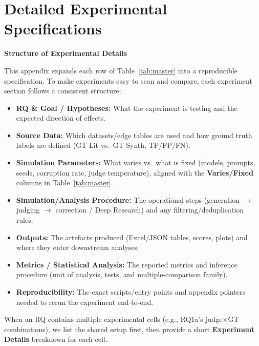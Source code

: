 \chapter{Detailed Experimental Specifications}
\label{app:experiment_details}

\label{sec:experimental_details}

\noindent\textbf{Structure of Experimental Details}
\label{sec:experiment_details_structure}

This appendix expands each row of Table~\ref{tab:master} into a reproducible specification. To make experiments easy to scan and compare, each experiment section follows a consistent structure:
\begin{itemize}[noitemsep]
    \item \textbf{RQ \& Goal / Hypotheses:} What the experiment is testing and the expected direction of effects.
    \item \textbf{Source Data:} Which datasets/edge tables are used and how ground truth labels are defined (GT Lit vs.\ GT Synth, TP/FP/FN).
    \item \textbf{Simulation Parameters:} What varies vs.\ what is fixed (models, prompts, seeds, corruption rate, judge temperature), aligned with the \textbf{Varies/Fixed} columns in Table~\ref{tab:master}.
    \item \textbf{Simulation/Analysis Procedure:} The operational steps (generation $\rightarrow$ judging $\rightarrow$ correction / Deep Research) and any filtering/deduplication rules.
    \item \textbf{Outputs:} The artefacts produced (Excel/JSON tables, scores, plots) and where they enter downstream analyses.
    \item \textbf{Metrics / Statistical Analysis:} The reported metrics and inference procedure (unit of analysis, tests, and multiple-comparison family).
    \item \textbf{Reproducibility:} The exact scripts/entry points and appendix pointers needed to rerun the experiment end-to-end.
\end{itemize}

When an RQ contains multiple experimental cells (e.g., RQ1a’s judge$\times$GT combinations), we list the shared setup first, then provide a short \textbf{Experiment Details} breakdown for each cell.

